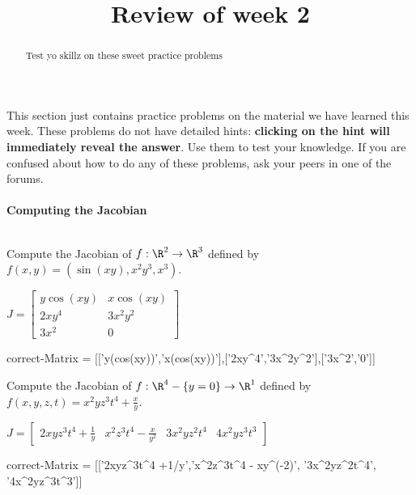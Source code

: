 \documentclass{ximera}
\title{Review of week 2}
\begin{document}
	\begin{abstract}
		Test yo skillz on these sweet practice problems
	\end{abstract}
	
	This section just contains practice problems on the material we have learned this week.  These problems do not have detailed hints:  \textbf{clicking on the hint will
	immediately reveal the answer}.  Use them to test your knowledge.  If you are confused about how to do any of these problems, ask your peers in one of the forums.
	\\
	\\
	\textbf{Computing the Jacobian}
	\\
	\\
	\begin{question}	
		Compute the Jacobian of $f:\R^2 \to \R^3$ defined by $f(x,y) = (\sin(xy),x^2y^3, x^3)$.
		\begin{solution}
		\begin{hint}
			\(J = \begin{bmatrix} y\cos(xy) & x\cos(xy) \\ 2xy^4 & 3x^2y^2 \\ 3x^2 & 0 \end{bmatrix}\)
		\end{hint}
		\begin{matrix-answer}[name=J]
			correct-Matrix  = [['y(cos(xy))','x(cos(xy))'],['2xy^4','3x^2y^2'],['3x^2','0']]
		\end{matrix-answer}
		\end{solution}
	\end{question}
	
	\begin{question}	
		Compute the Jacobian of $f:\R^4 - \{y=0\} \to \R^1$ defined by $f(x,y,z,t) = x^2yz^3t^4+\frac{x}{y}$.
		\begin{solution}
		\begin{hint}
			\(J = \begin{bmatrix} 2xyz^3t^4 +\frac{1}{y} & x^2z^3t^4 - \frac{x}{y^2} & 3x^2yz^2t^4 & 4x^2yz^3t^3\end{bmatrix}\)
		\end{hint}
		\begin{matrix-answer}[name=J]
			correct-Matrix  = [['2xyz^3t^4 +1/y','x^2z^3t^4 - xy^(-2)', '3x^2yz^2t^4', '4x^2yz^3t^3']]
		\end{matrix-answer}
		\end{solution}
	\end{question}
	
\end{document}
